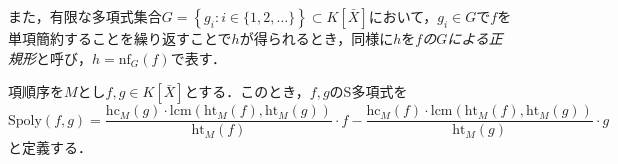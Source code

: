 また，有限な多項式集合$G=\left\{g_i :i \in \{1,2, \dots\}\right\} \subset K[\bar{X}]$において，$g_i \in G$で$f$を単項簡約することを繰り返すことで$h$が得られるとき，同様に$h$を\emph{$f$の$G$による正規形}と呼び，$h = \mathrm{nf}_G(f)$で表す．
\begin{definition}[S多項式]
	項順序を$M$とし$f, g \in K[\bar{X}]$とする．このとき，$f, g$のS多項式を
	$$\mathrm{Spoly}(f, g)=\frac{\mathrm{hc}_M(g)\cdot \mathrm{lcm}(\mathrm{ht}_M(f), \mathrm{ht}_M(g))}{\mathrm{ht}_M(f)}\cdot f - \frac{\mathrm{hc}_M(f)\cdot \mathrm{lcm}(\mathrm{ht}_M(f), \mathrm{ht}_M(g))}{\mathrm{ht}_M(g)}\cdot g$$
	と定義する．
	\end{definition}








